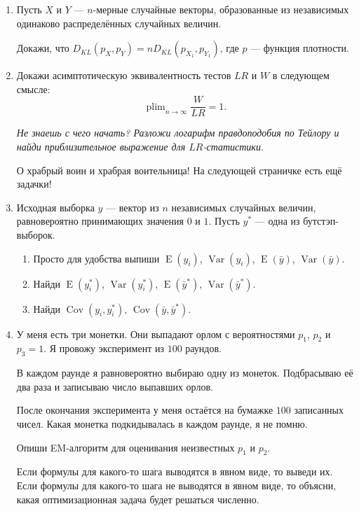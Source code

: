 \documentclass[12pt]{article}
\DeclareMathOperator{\Cov}{Cov}
\DeclareMathOperator{\plim}{plim}
\DeclareMathOperator{\Var}{Var}
\DeclareMathOperator{\E}{E}
\begin{document}
\begin{enumerate}
	
	\item 
	
	Пусть $X$ и $Y$ — $n$-мерные случайные векторы, 
	образованные из независимых одинаково распределённых случайных величин. 
	
	Докажи, что $D_{KL}(p_X, p_Y) = nD_{KL}(p_{X_1}, p_{Y_1})$, где $p$ — функция плотности.
	
	\item 
	
	Докажи асимптотическую эквивалентность тестов $LR$ и $W$ в следующем смысле:
	\[
	\plim_{n \to \infty} \frac{W}{LR} = 1.
	\]
	
	\textit{Не знаешь с чего начать? Разложи логарифм правдоподобия по Тейлору и найди приблизительное выражение для $LR$-статистики}.
	

	\vspace{20pt}

	О храбрый воин и храбрая воительница! На следующей страничке есть ещё задачки! 

	\newpage
	\item Исходная выборка $y$ — вектор из $n$ независимых случайных величин, 
	равновероятно принимающих значения $0$ и $1$. Пусть $y^*$ — одна из бутстэп-выборок.

	\begin{enumerate}
		\item Просто для удобства выпиши $\E(y_i)$, $\Var(y_i)$, $\E(\bar y)$, $\Var(\bar y)$.
		\item Найди $\E(y^*_i)$, $\Var(y^*_i)$, $\E(\bar y^*)$, $\Var(\bar y^*)$.
		\item Найди $\Cov(y_i, y_i^*)$, $\Cov(\bar y, \bar y^*)$.
	\end{enumerate}

	
	\item 

	У меня есть три монетки. 
	Они выпадают орлом с вероятностями $p_1$, $p_2$ и $p_3 = 1$.  
	Я провожу эксперимент из $100$ раундов.

	В каждом раунде я равновероятно выбираю одну из монеток. 
	Подбрасываю её два раза и записываю число выпавших орлов. 

	После окончания эксперимента у меня остаётся на бумажке $100$ записанных чисел. 
	Какая монетка подкидывалась в каждом раунде, я не помню. 

	Опиши EM-алгоритм для оценивания неизвестных $p_1$ и $p_2$.

	Если формулы для какого-то шага выводятся в явном виде, то выведи их.
	Если формулы для какого-то шага не выводятся в явном виде, то объясни, 
	какая оптимизационная задача будет решаться численно. 



\end{enumerate}
\end{document}

